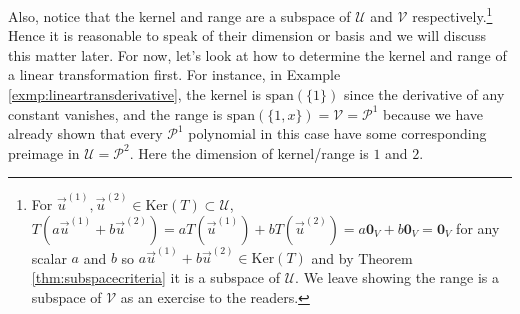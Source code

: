 Also, notice that the kernel and range are a subspace of $\mathcal{U}$ and $\mathcal{V}$ respectively.\footnote{For $\vec{u}^{(1)}, \vec{u}^{(2)} \in \text{Ker}(T) \subset \mathcal{U}$, $T(a\vec{u}^{(1)} + b\vec{u}^{(2)}) = aT(\vec{u}^{(1)}) + bT(\vec{u}^{(2)}) = a\textbf{0}_V + b\textbf{0}_V = \textbf{0}_V$ for any scalar $a$ and $b$ so $a\vec{u}^{(1)} + b\vec{u}^{(2)} \in \text{Ker}(T)$ and by Theorem \ref{thm:subspacecriteria} it is a subspace of $\mathcal{U}$. We leave showing the range is a subspace of $\mathcal{V}$ as an exercise to the readers.} Hence it is reasonable to speak of their dimension or basis and we will discuss this matter later. For now, let's look at how to determine the kernel and range of a linear transformation first. For instance, in Example \ref{exmp:lineartransderivative}, the kernel is $\text{span}(\{1\})$ since the derivative of any constant vanishes, and the range is $\text{span}(\{1, x\}) = \mathcal{V} = \mathcal{P}^1$ because we have already shown that every $\mathcal{P}^1$ polynomial in this case have some corresponding preimage in $\mathcal{U} = \mathcal{P}^2$. Here the dimension of kernel/range is $1$ and $2$.

